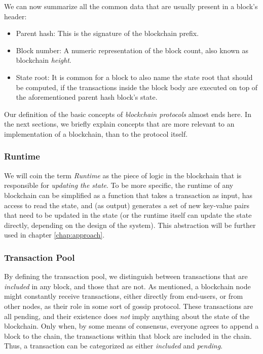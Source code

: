 We can now summarize all the common data that are usually present in a block's header:

\begin{itemize}
	\item Parent hash: This is the signature of the blockchain prefix.
	\item Block number: A numeric representation of the block count, also known as blockchain
	\textit{height}.
	\item State root: It is common for a block to also name the state root that should be
	computed, if the transactions inside the block body are executed on top of the aforementioned
	parent hash block's state.
\end{itemize}

Our definition of the basic concepts of \textit{blockchain protocols} almost ends here. In the next
sections, we briefly explain concepts that are more relevant to an implementation of a
blockchain, than to the protocol itself.

\subsubsection{Runtime} \label{chap_bg:subsec:runtime}

We will coin the term \textit{Runtime} as the piece of logic in the
blockchain that is responsible for \textit{updating the state}. To be more specific, the runtime of
any blockchain can be simplified as a function that takes a transaction as input, has access
to read the state, and (as output) generates a set of new key-value pairs that need to be updated in
the state (or the runtime itself can update the state directly, depending on the design of the
system). This abstraction will be further used in chapter \ref{chap:approach}.

\subsubsection{Transaction Pool} \label{chap_bg:subsec:tx_pool}

By defining the transaction pool, we distinguish between transactions that are \textit{included} in any
block, and those that are not. As mentioned, a blockchain node might constantly receive transactions, either directly from end-users, or from other nodes, as their role in some sort of gossip protocol. These transactions are all pending, and their existence does \textit{not} imply anything about the state of the blockchain. Only when, by some means of consensus, everyone agrees
to append a block to the chain, the transactions within that block are included in the chain.
Thus, a transaction can be categorized as either \textit{included} and \textit{pending}.

